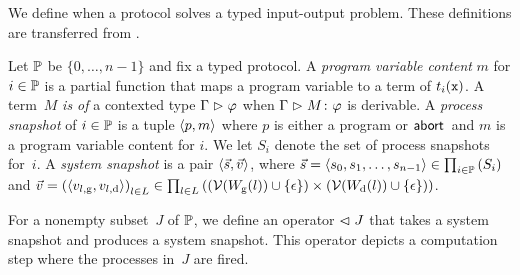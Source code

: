 We define when a protocol solves a typed
input-output problem.
These definitions are transferred from \cite{Saks:1993vq}.

Let $\mathbb{P}$ be $\{0,\ldots, n-1\}$ and fix
a typed protocol.
A \textit{program variable content} $m$ for $i\in\mathbb{P}$ is a
partial
function
that maps a program variable to a term of $t_i(\texttt{x})$.
A term~$M$ \textit{is of} a contexted type $\Gamma\vartriangleright\varphi$ when
$\Gamma\vartriangleright
{M} \colon{\varphi}$ is derivable.
A \textit{process snapshot} of $i\in\mathbb{P}$ is a tuple
$\langle{p,m}\rangle$ where $p$ is either a program or $\mathsf{abort\,}$ and $m$ is a
program variable content for $i$.
We let $S_i$ denote the set of process snapshots for~$i$.
A \textit{system snapshot}
is a pair $\langle{\vec s, \vec v}\rangle$, where $\vec s = \langle{s_0,
{s_1,{\ldots,s_{n-1}}}}\rangle \in
\prod_{i\in \mathbb{P}}\left(S_i\right)
$
and
$\vec v =
\left(\langle{{v}_{l, \mathrm g}, {v}_{l, \mathrm d}}\rangle\right)_{l\in L} \in \prod_{l\in
L}\left((\mathcal{V}(W_{\mathrm g}(l))\cup\{\epsilon\})\times (\mathcal{V}(W_{\mathrm d}(l))\cup\{\epsilon\})\right)
$.

For a nonempty subset~$J$ of $\mathbb{P}$, we define an operator $\vartriangleleft J$ that
takes a system snapshot and produces a system snapshot.
This operator depicts a computation step where the processes in~$J$
are fired.

